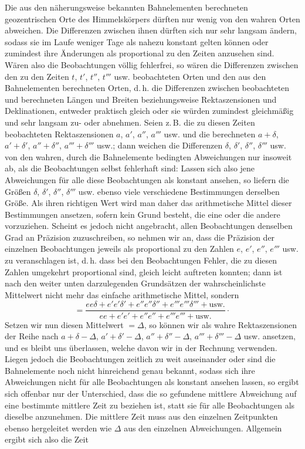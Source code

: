 Die aus den näherungsweise bekannten Bahnelementen berechneten geozentrischen Orte des Himmelskörpers dürften nur wenig von den wahren Orten abweichen. Die Differenzen zwischen ihnen dürften sich nur sehr langsam ändern, sodass sie im Laufe weniger Tage als nahezu konstant gelten können oder zumindest ihre Änderungen als proportional zu den Zeiten anzusehen sind. Wären also die Beobachtungen völlig fehlerfrei, so wären die Differenzen zwischen den zu den Zeiten $t$, $t'$, $t''$, $t'''$ usw. beobachteten Orten und den aus den Bahnelementen berechneten Orten, d.\,h. die Differenzen zwischen beobachteten und berechneten Längen und Breiten beziehungsweise Rektaszensionen und Deklinationen, entweder praktisch gleich oder sie würden zumindest gleichmäßig und sehr langsam zu- oder abnehmen. Seien z.\,B. die zu diesen Zeiten beobachteten Rektaszensionen $a$, $a'$, $a''$, $a'''$ usw. und die berechneten $a+\delta$, $a'+\delta'$, $a''+\delta''$, $a'''+\delta'''$ usw.; dann weichen die Differenzen $\delta$, $\delta'$, $\delta''$, $\delta'''$ usw. von den wahren, durch die Bahnelemente bedingten Abweichungen nur insoweit ab, als die Beobachtungen selbst fehlerhaft sind: Lassen sich also jene Abweichungen für alle diese Beobachtungen als konstant ansehen, so liefern die Größen $\delta$, $\delta'$, $\delta''$, $\delta'''$ usw. ebenso viele verschiedene Bestimmungen derselben Größe. Als ihren richtigen Wert wird man daher das arithmetische Mittel dieser Bestimmungen ansetzen, sofern kein Grund besteht, die eine oder die andere vorzuziehen. Scheint es jedoch nicht angebracht, allen Beobachtungen denselben Grad an Präzision zuzuschreiben, so nehmen wir an, dass die Präzision der einzelnen Beobachtungen jeweils als proportional zu den Zahlen $e$, $e'$, $e''$, $e'''$ usw. zu veranschlagen ist, d.\,h. dass bei den Beobachtungen Fehler, die zu diesen Zahlen umgekehrt proportional sind, gleich leicht auftreten konnten; dann ist nach den weiter unten darzulegenden Grundsätzen der wahrscheinlichste Mittelwert nicht mehr das einfache arithmetische Mittel, sondern
\[
=\frac{ee\delta+e'e'\delta'+e''e''\delta''+e'''e'''\delta'''+\text{usw.}}
{ee+e'e'+e''e''+e'''e'''+\text{usw.}}\mathpunct{\cdot}
\]
Setzen wir nun diesen Mittelwert $=\Delta$, so können wir als wahre Rektaszensionen der Reihe nach $a+\delta-\Delta$, $a'+\delta'-\Delta$, $a''+\delta''-\Delta$, $a'''+\delta'''-\Delta$ usw. ansetzen, und es bleibt uns überlassen, welche davon wir in der Rechnung verwenden. Liegen jedoch die Beobachtungen zeitlich zu weit auseinander oder sind die Bahnelemente noch nicht hinreichend genau bekannt, sodass sich ihre Abweichungen nicht für alle Beobachtungen als konstant ansehen lassen, so ergibt sich offenbar nur der Unterschied, dass die so gefundene mittlere Abweichung auf eine bestimmte mittlere Zeit zu beziehen ist, statt sie für alle Beobachtungen als dieselbe anzunehmen. Die mittlere Zeit muss aus den einzelnen Zeitpunkten ebenso hergeleitet werden wie $\Delta$ aus den einzelnen Abweichungen. Allgemein ergibt sich also die Zeit
